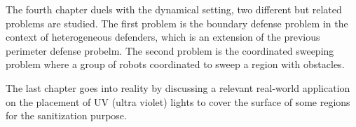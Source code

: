 \begin{my_abstract}
The fourth chapter duels with the dynamical setting, two different but related problems are studied. 
The first problem is the boundary defense problem in the context of heterogeneous defenders, which is an extension of the previous
perimeter defense probelm. 
The second problem is the coordinated sweeping problem where a group of robots coordinated to sweep a region with obstacles. 

The last chapter goes into reality by discussing a relevant real-world application on the placement of UV (ultra violet) lights
to cover the surface of some regions for the sanitization purpose. 

\end{my_abstract}
